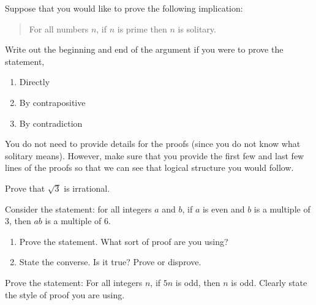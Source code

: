 \documentclass[10pt,]{book}
\theoremstyle{plain}
\theoremstyle{definition}
\theoremstyle{definition}
\theoremstyle{definition}
\theoremstyle{definition}
\numberwithin{equation}{chapter}
\begin{document}
\begin{divisionexercise}{5}\hypertarget{exercise-240}{}
\hypertarget{p-2140}{}%
Suppose that you would like to prove the following implication:%
\begin{quote}\hypertarget{blockquote-16}{}
\hypertarget{p-2141}{}%
For all numbers \(n\), if \(n\) is prime then \(n\) is solitary.%
\end{quote}
\hypertarget{p-2142}{}%
Write out the beginning and end of the argument if you were to prove the statement,%
\par
\hypertarget{p-2143}{}%
\leavevmode%
\begin{enumerate}[label=(\alph*)]
\item\hypertarget{li-705}{}\hypertarget{p-2144}{}%
Directly %
\item\hypertarget{li-706}{}\hypertarget{p-2145}{}%
By contrapositive %
\item\hypertarget{li-707}{}\hypertarget{p-2146}{}%
By contradiction %
\end{enumerate}
%
\par
\hypertarget{p-2147}{}%
You do not need to provide details for the proofs (since you do not know what solitary means). However, make sure that you provide the first few and last few lines of the proofs so that we can see that logical structure you would follow.%
\end{divisionexercise}%
\begin{divisionexercise}{6}\hypertarget{exercise-241}{}
\hypertarget{p-2148}{}%
Prove that \(\sqrt 3\) is irrational.%
\end{divisionexercise}%
\begin{divisionexercise}{7}\hypertarget{exercise-242}{}
\hypertarget{p-2153}{}%
Consider the statement: for all integers \(a\) and \(b\), if \(a\) is even and \(b\) is a multiple of 3, then \(ab\) is a multiple of 6.%
\par
\hypertarget{p-2154}{}%
\leavevmode%
\begin{enumerate}[label=(\alph*)]
\item\hypertarget{li-708}{}\hypertarget{p-2155}{}%
Prove the statement. What sort of proof are you using?%
\item\hypertarget{li-709}{}\hypertarget{p-2156}{}%
State the converse. Is it true? Prove or disprove.%
\end{enumerate}
%
\end{divisionexercise}%
\begin{divisionexercise}{8}\hypertarget{exercise-243}{}
\hypertarget{p-2157}{}%
Prove the statement: For all integers \(n\), if \(5n\) is odd, then \(n\) is odd. Clearly state the style of proof you are using.%
\end{divisionexercise}%
\end{document}
